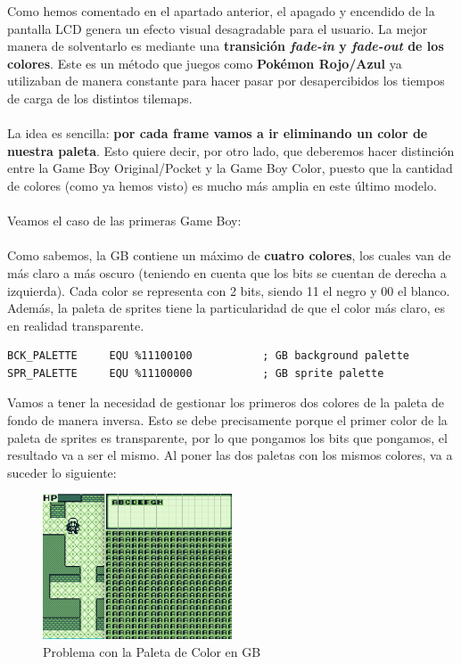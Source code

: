 Como hemos comentado en el apartado anterior, el apagado y encendido de la pantalla LCD genera un efecto visual desagradable para el usuario. La mejor manera de solventarlo es mediante una \textbf{transición \textit{fade-in} y \textit{fade-out} de los colores}.
Este es un método que juegos como \textbf{Pokémon Rojo/Azul} ya utilizaban de manera constante para hacer pasar por desapercibidos los tiempos de carga de los distintos tilemaps.
\\ \\
La idea es sencilla: \textbf{por cada frame vamos a ir eliminando un color de nuestra paleta}. Esto quiere decir, por otro lado, que deberemos hacer distinción entre la Game Boy Original/Pocket y la Game Boy Color, puesto que la cantidad de colores (como ya hemos visto) es mucho más amplia en este último modelo.
\\ \\
Veamos el caso de las primeras Game Boy:
\\ \\
Como sabemos, la GB contiene un máximo de \textbf{cuatro colores}, los cuales van de más claro a más oscuro (teniendo en cuenta que los bits se cuentan de derecha a izquierda). Cada color se representa con 2 bits, siendo 11 el negro y 00 el blanco. Además, la paleta de sprites tiene la particularidad de que el color más claro, es en realidad transparente.

\begin{lstlisting}[caption={Paleta de Color en GB}, label={code:gbpal}]
BCK_PALETTE 	EQU %11100100 			; GB background palette
SPR_PALETTE 	EQU %11100000 			; GB sprite palette
\end{lstlisting}

Vamos a tener la necesidad de gestionar los primeros dos colores de la paleta de fondo de manera inversa. Esto se debe precisamente porque el primer color de la paleta de sprites es transparente, por lo que pongamos los bits que pongamos, el resultado va a ser el mismo. Al poner las dos paletas con los mismos colores, va a suceder lo siguiente:

\begin{figure}[h]
\centering
\includegraphics[width=0.5\textwidth]{include/images/desarrollo/pal_problem.png}
\caption{Problema con la Paleta de Color en GB}
\label{figure:transitiongb}
\end{figure}

